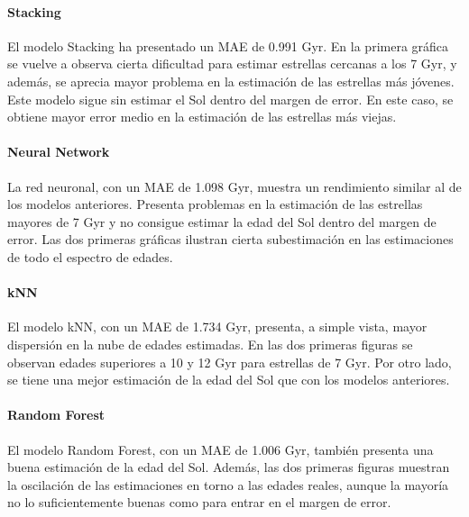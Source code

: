 \paragraph{Stacking} 
El modelo Stacking ha presentado un MAE de 0.991 Gyr. En la primera gráfica se vuelve a observa cierta dificultad para estimar estrellas cercanas a los 7 Gyr, y además, se aprecia mayor problema en la estimación de las estrellas más jóvenes. Este modelo sigue sin estimar el Sol dentro del margen de error. En este caso, se obtiene mayor error medio en la estimación de las estrellas más viejas.

\paragraph{Neural Network} 
La red neuronal, con un MAE de 1.098 Gyr, muestra un rendimiento similar al de los modelos anteriores. Presenta problemas en la estimación de las estrellas mayores de 7 Gyr y no consigue estimar la edad del Sol dentro del margen de error. Las dos primeras gráficas ilustran cierta subestimación en las estimaciones de todo el espectro de edades.

\paragraph{kNN} 
El modelo kNN, con un MAE de 1.734 Gyr, presenta, a simple vista, mayor dispersión en la nube de edades estimadas. En las dos primeras figuras se observan edades superiores a 10 y 12 Gyr para estrellas de 7 Gyr. Por otro lado, se tiene una mejor estimación de la edad del Sol que con los modelos anteriores.

\paragraph{Random Forest} 
El modelo Random Forest, con un MAE de 1.006 Gyr, también presenta una buena estimación de la edad del Sol. Además, las dos primeras figuras muestran la oscilación de las estimaciones en torno a las edades reales, aunque la mayoría no lo suficientemente buenas como para entrar en el margen de error.

